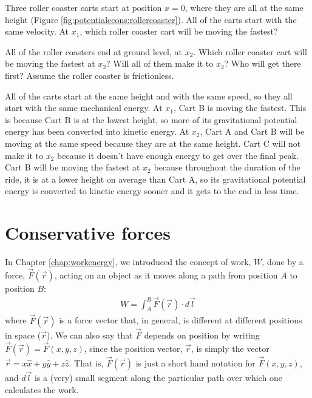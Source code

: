 \begin{opening}
Three roller coaster carts start at position $x=0$,  where they are all at the same height (Figure \ref{fig:potentialecons:rollercoaster}). All of the carts start with the same velocity. At $x_1$, which roller coaster cart will be moving the fastest? 

All of the roller coasters end at ground level, at $x_2$. Which roller coaster cart will be moving the fastest at $x_2$? Will all of them make it to $x_2$? Who will get there first?  Assume the roller coaster is frictionless.
\begin{answer}
All of the carts start at the same height and with the same speed, so they all start with the same mechanical energy. At $x_1$, Cart B is moving the fastest. This is because Cart B is at the lowest height, so more of its gravitational potential energy has been converted into kinetic energy. At $x_2$, Cart A and Cart B will be moving at the same speed because they are at the same height. Cart C will not make it to $x_2$ because it doesn't have enough energy to get over the final peak. Cart B will be moving the fastest at $x_2$ because throughout the duration of the ride, it is at a lower height on average than Cart A, so its gravitational potential energy is converted to kinetic energy sooner and it gets to the end in less time.   
\end{answer}
\end{opening}

\section{Conservative forces}
In Chapter \ref{chap:workenergy}, we introduced the concept of work, $W$, done by a force, $\vec F(\vec r)$, acting on an object as it moves along a path from position $A$ to position $B$:
\begin{align}
\label{eq:potentialecons:workdef}
W = \int_A^B \vec F(\vec r) \cdot d\vec l
\end{align}
where $\vec F(\vec r)$ is a force vector that, in general, is different at different positions in space ($\vec r$). We can also say that $\vec F$ depends on position by writing $\vec F(\vec r)=\vec F(x,y,z)$, since the position vector, $\vec r$, is simply the vector $\vec r = x\hat x + y \hat y+ z\hat z$. That is, $\vec F(\vec r)$ is just a short hand notation for $\vec F(x,y,z)$, and $d\vec l$ is a (very) small segment along the particular path over which one calculates the work.

